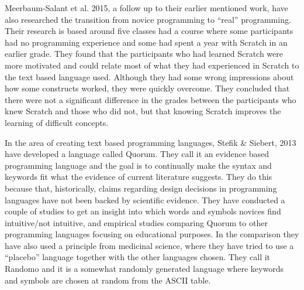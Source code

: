 Meerbaum-Salant et al. 2015\cite{8}, a follow up to their earlier mentioned work, have also researched the transition from novice programming to ``real'' programming. Their research is based around five classes had a course where some participants had no programming experience and some had spent a year with Scratch in an earlier grade. They found that the participants who had learned Scratch were more motivated and could relate most of what they had experienced in Scratch to the text based language used. Although they had some wrong impressions about how some constructs worked, they were quickly overcome. They concluded that there were not a significant difference in the grades between the participants who knew Scratch and those who did not, but that knowing Scratch improves the learning of difficult concepts.

In the area of creating text based programming languages, Stefik \& Siebert, 2013\cite{9} have developed a language called Quorum. They call it an evidence based programming language and the goal is to continually make the syntax and keywords fit what the evidence of current literature suggests. They do this because that, historically, claims regarding design decisions in programming languages have not been backed by scientific evidence\cite{10}. They have conducted a couple of studies to get an insight into which words and symbols novices find intuitive/not intuitive, and empirical studies comparing Quorum to other programming languages focusing on educational purposes. In the comparison they have also used a principle from medicinal science, where they have tried to use a ``placebo'' language together with the other languages chosen. They call it Randomo and it is a somewhat randomly generated language where keywords and symbols are chosen at random from the ASCII table.



